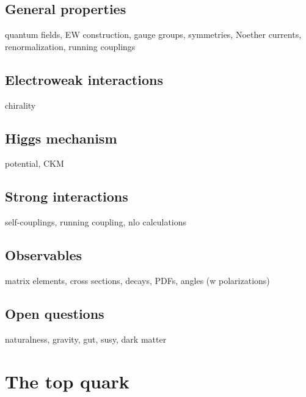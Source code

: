 
\subsection{General properties}
quantum fields, EW construction, gauge groups, symmetries, Noether currents, renormalization, running couplings
\subsection{Electroweak interactions}
\label{sec:theory-ewk}
chirality
\subsection{Higgs mechanism}
potential, CKM
\subsection{Strong interactions}
\label{sec:theory-qcd}
self-couplings, running coupling, nlo calculations
\subsection{Observables}
matrix elements, cross sections, decays, PDFs, angles (w polarizations)
\subsection{Open questions}
naturalness, gravity, gut, susy, dark matter

\section{The top quark}
\subsection{}
